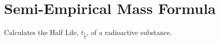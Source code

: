 \hypertarget{group___semi_empirical_mass_formula}{}\section{Semi-\/\+Empirical Mass Formula}
\label{group___semi_empirical_mass_formula}
Calculates the Half Life, $t_{\frac{1}{2}}$, of a radioactive substance. 